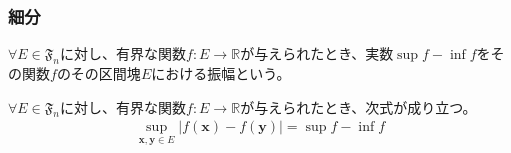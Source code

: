 \documentclass[dvipdfmx]{jsarticle}
\begin{document}
\subsubsection{細分}%
\begin{dfn}
$\forall E \in \mathfrak{F}_{n}$に対し、有界な関数$f:E \rightarrow \mathbb{R}$が与えられたとき、実数$\sup f - \inf f$をその関数$f$のその区間塊$E$における振幅という。
\end{dfn}
\begin{thm}\label{4.6.5.9}
$\forall E \in \mathfrak{F}_{n}$に対し、有界な関数$f:E \rightarrow \mathbb{R}$が与えられたとき、次式が成り立つ。
\begin{align*}
\sup_{\mathbf{x},\mathbf{y} \in E}\left| f\left( \mathbf{x} \right) - f\left( \mathbf{y} \right) \right| = \sup f - \inf f
\end{align*}
\end{thm}
\end{document}
